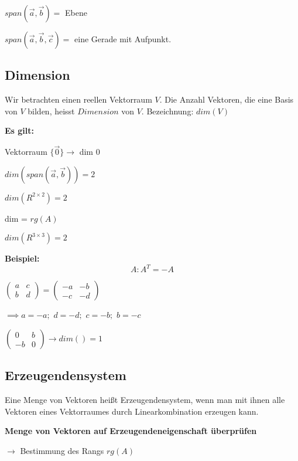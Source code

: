\begin{multicols*}{3}
    {$span(\vec{a},\vec{b}) = $ Ebene}

    {$span(\vec{a},\vec{b},\vec{c}) = $ eine Gerade mit Aufpunkt.}


    \subsection{Dimension}
    { Wir betrachten einen reellen Vektorraum $V$.
        Die Anzahl Vektoren, die eine Basis von $V$ bilden, heisst $Dimension$ von $V$.
    }
    {Bezeichnung: $dim(V)$}

    {\textbf{Es gilt:} }
    \begin{multicols}{2}
        {Vektorraum $\{ \vec{0} \} \rightarrow $ dim $0$}

        {$dim(span(\vec{a},\vec{b})) = 2$}

        {$dim(R^{2 \times 2})=2$}
        \columnbreak

        {dim = $rg(A)$}

        {$dim(R^{3 \times 3})=2$}

    \end{multicols}
    {\textbf{Beispiel:} }
    $$A: A^T = -A$$

    $ \begin{pmatrix}
            a & c \\
            b & d
        \end{pmatrix} =
        \begin{pmatrix}
            -a & -b \\
            -c & -d
        \end{pmatrix}$

    $\implies a=-a;$ $d=-d;$ $c=-b;$ $b=-c$

    $        \begin{pmatrix}
            0  & b \\
            -b & 0
        \end{pmatrix} \to dim() = 1$



    \subsection{Erzeugendensystem}
    {Eine Menge von Vektoren heißt Erzeugendensystem, wenn man mit ihnen alle Vektoren eines Vektorraumes durch Linearkombination erzeugen kann.}

    {\textbf{Menge von Vektoren auf Erzeugendeneigenschaft überprüfen}}

    {$\rightarrow$ Bestimmung des Rangs $rg(A)$}


\end{multicols*}
